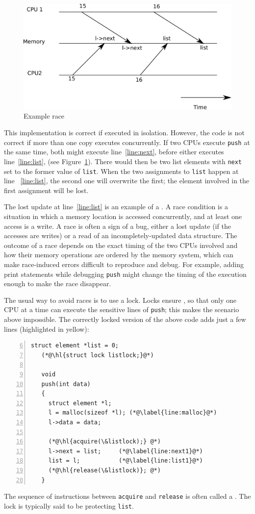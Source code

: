 \begin{figure}[t]
\center
\includegraphics[scale=0.5]{fig/race.pdf}
\caption{Example race}
\label{fig:race}
\end{figure}
This implementation is correct if executed in isolation.
However, the code is not correct if more than one
copy executes concurrently.
If two CPUs execute
\lstinline{push}
at the same time,
both might execute line~\ref{line:next},
before either executes line~\ref{line:list},  (see 
Figure~\ref{fig:race}).
There would then be two
list elements with
\lstinline{next}
set to the former value of
\lstinline{list}.
When the two assignments to
\lstinline{list}
happen at line ~\ref{line:list},
the second one will overwrite the first;
the element involved in the first assignment
will be lost.

The lost update at line~\ref{line:list} is an example of a
.
A race condition is a situation in which a memory location is accessed
concurrently, and at least one access is a write.
A race is often a sign of a bug, either a lost update
(if the accesses are writes) or a read of
an incompletely-updated data structure.
The outcome of a race depends on
the exact timing of the two CPUs involved and
how their memory operations are ordered by the memory system,
which can make race-induced errors difficult to reproduce
and debug.
For example, adding print statements while debugging
\lstinline{push}
might change the timing of the execution enough
to make the race disappear.

The usual way to avoid races is to use a lock.
Locks ensure
,
so that only one CPU at a time can execute 
the sensitive lines of
\lstinline{push};
this makes the scenario above impossible.
The correctly locked version of the above code
adds just a few lines (highlighted in yellow):
\begin{lstlisting}[numbers=left,firstnumber=6]
   struct element *list = 0;
   (*@\hl{struct lock listlock;}@*)
    	
   void
   push(int data)
   {
     struct element *l;
     l = malloc(sizeof *l); (*@\label{line:malloc}@*)
     l->data = data;
   
     (*@\hl{acquire(\&listlock);} @*)
     l->next = list;     (*@\label{line:next1}@*)
     list = l;           (*@\label{line:list1}@*)
     (*@\hl{release(\&listlock)}; @*)
   }
\end{lstlisting}
The sequence of instructions between
\lstinline{acquire}
and
\lstinline{release}
is often called a
.
The lock is typically said to be protecting
\lstinline{list}.

